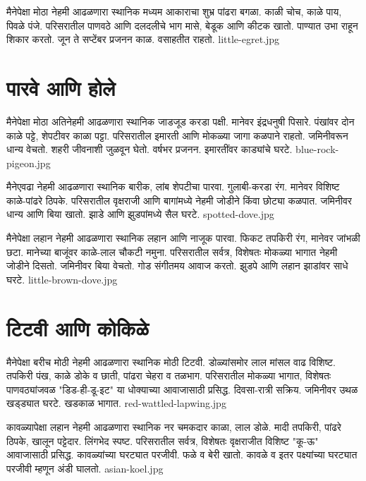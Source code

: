 \documentclass[aspectratio=169]{beamer}
\begin{document}
{मैनेपेक्षा मोठा}
{नेहमी आढळणारा स्थानिक}
{मध्यम आकाराचा शुभ्र पांढरा बगळा. काळी चोच, काळे पाय, पिवळे पंजे.}
{परिसरातील पाणवठे आणि दलदलीचे भाग}
{मासे, बेडूक आणि कीटक खातो. पाण्यात उभा राहून शिकार करतो.}
{जून ते सप्टेंबर प्रजनन काळ. वसाहतीत राहतो.}
{little-egret.jpg}

\section{पारवे आणि होले}
{मैनेपेक्षा मोठा}
{अतिनेहमी आढळणारा स्थानिक}
{जाडजूड करडा पक्षी. मानेवर इंद्रधनुषी पिसारे. पंखांवर दोन काळे पट्टे, शेपटीवर काळा पट्टा.}
{परिसरातील इमारती आणि मोकळ्या जागा}
{कळपाने राहतो. जमिनीवरून धान्य वेचतो. शहरी जीवनाशी जुळवून घेतो.}
{वर्षभर प्रजनन. इमारतींवर काड्यांचे घरटे.}
{blue-rock-pigeon.jpg}

{मैनेएवढा}
{नेहमी आढळणारा स्थानिक}
{बारीक, लांब शेपटीचा पारवा. गुलाबी-करडा रंग. मानेवर विशिष्ट काळे-पांढरे ठिपके.}
{परिसरातील वृक्षराजी आणि बागांमध्ये}
{नेहमी जोडीने किंवा छोट्या कळपात. जमिनीवर धान्य आणि बिया खातो.}
{झाडे आणि झुडपांमध्ये सैल घरटे.}
{spotted-dove.jpg}

{मैनेपेक्षा लहान}
{नेहमी आढळणारा स्थानिक}
{लहान आणि नाजूक पारवा. फिकट तपकिरी रंग, मानेवर जांभळी छटा. मानेच्या बाजूंवर काळे-लाल चौकटी नमुना.}
{परिसरातील सर्वत्र, विशेषतः मोकळ्या भागात}
{नेहमी जोडीने दिसतो. जमिनीवर बिया वेचतो. गोड संगीतमय आवाज करतो.}
{झुडपे आणि लहान झाडांवर साधे घरटे.}
{little-brown-dove.jpg}

\section{टिटवी आणि कोकिळे}
{मैनेपेक्षा बरीच मोठी}
{नेहमी आढळणारा स्थानिक}
{मोठी टिटवी. डोळ्यांसमोर लाल मांसल वाढ विशिष्ट. तपकिरी पंख, काळे डोके व छाती, पांढरा चेहरा व तळभाग.}
{परिसरातील मोकळ्या भागात, विशेषतः पाणवठ्यांजवळ}
{"डिड-ही-डू-इट" या धोक्याच्या आवाजासाठी प्रसिद्ध. दिवसा-रात्री सक्रिय.}
{जमिनीवर उथळ खड्ड्यात घरटे. खडकाळ भागात.}
{red-wattled-lapwing.jpg}

{कावळ्यापेक्षा लहान}
{नेहमी आढळणारा स्थानिक}
{नर चमकदार काळा, लाल डोळे. मादी तपकिरी, पांढरे ठिपके, खालून पट्टेदार. लिंगभेद स्पष्ट.}
{परिसरातील सर्वत्र, विशेषतः वृक्षराजीत}
{विशिष्ट "कू-ऊ" आवाजासाठी प्रसिद्ध. कावळ्यांच्या घरट्यात परजीवी. फळे व बेरी खातो.}
{कावळे व इतर पक्ष्यांच्या घरट्यात परजीवी म्हणून अंडी घालतो.}
{asian-koel.jpg}
\end{document}
